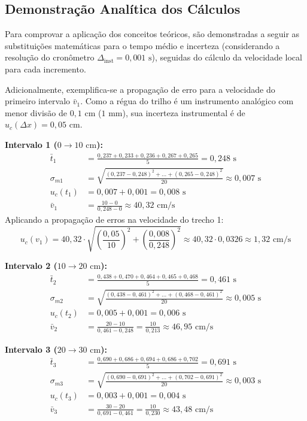 \documentclass[12pt, a4paper]{article}
\begin{document}
\subsection{Demonstração Analítica dos Cálculos}
Para comprovar a aplicação dos conceitos teóricos, são demonstradas a seguir as substituições matemáticas para o tempo médio e incerteza (considerando a resolução do cronômetro $\Delta_{\text{inst}} = 0,001\text{ s}$), seguidas do cálculo da velocidade local para cada incremento. 

Adicionalmente, exemplifica-se a propagação de erro para a velocidade do primeiro intervalo $\bar{v}_1$. Como a régua do trilho é um instrumento analógico com menor divisão de $0,1\text{ cm}$ ($1\text{ mm}$), sua incerteza instrumental é de $u_c(\Delta x) = 0,05\text{ cm}$.

\vspace{0.3cm}
\noindent \textbf{Intervalo 1 ($0 \rightarrow 10\text{ cm}$):}
\begin{align*}
    \bar{t}_1 &= \frac{0,237 + 0,233 + 0,236 + 0,267 + 0,265}{5} = 0,248\text{ s} \\
    \sigma_{m1} &= \sqrt{\frac{(0,237-0,248)^2 + \dots + (0,265-0,248)^2}{20}} \approx 0,007\text{ s} \\
    u_c(t_1) &= 0,007 + 0,001 = 0,008\text{ s} \\
    \bar{v}_1 &= \frac{10 - 0}{0,248 - 0} \approx 40,32\text{ cm/s}
\end{align*}
Aplicando a propagação de erros na velocidade do trecho 1:
\begin{equation*}
    u_c(v_1) = 40,32 \cdot \sqrt{\left(\frac{0,05}{10}\right)^2 + \left(\frac{0,008}{0,248}\right)^2} \approx 40,32 \cdot 0,0326 \approx 1,32\text{ cm/s}
\end{equation*}

\noindent \textbf{Intervalo 2 ($10 \rightarrow 20\text{ cm}$):}
\begin{align*}
    \bar{t}_2 &= \frac{0,438 + 0,470 + 0,464 + 0,465 + 0,468}{5} = 0,461\text{ s} \\
    \sigma_{m2} &= \sqrt{\frac{(0,438-0,461)^2 + \dots + (0,468-0,461)^2}{20}} \approx 0,005\text{ s} \\
    u_c(t_2) &= 0,005 + 0,001 = 0,006\text{ s} \\
    \bar{v}_2 &= \frac{20 - 10}{0,461 - 0,248} = \frac{10}{0,213} \approx 46,95\text{ cm/s}
\end{align*}

\noindent \textbf{Intervalo 3 ($20 \rightarrow 30\text{ cm}$):}
\begin{align*}
    \bar{t}_3 &= \frac{0,690 + 0,686 + 0,694 + 0,686 + 0,702}{5} = 0,691\text{ s} \\
    \sigma_{m3} &= \sqrt{\frac{(0,690-0,691)^2 + \dots + (0,702-0,691)^2}{20}} \approx 0,003\text{ s} \\
    u_c(t_3) &= 0,003 + 0,001 = 0,004\text{ s} \\
    \bar{v}_3 &= \frac{30 - 20}{0,691 - 0,461} = \frac{10}{0,230} \approx 43,48\text{ cm/s}
\end{align*}
\end{document}
